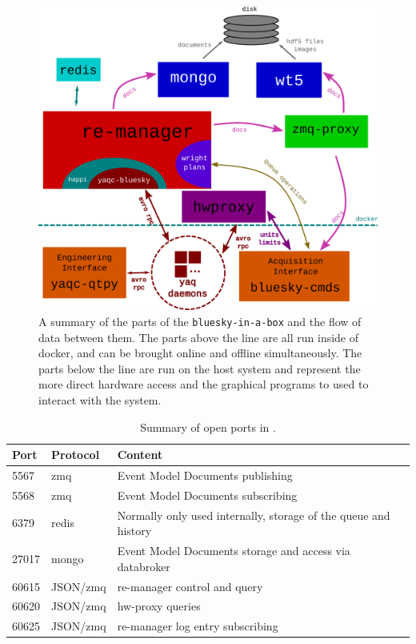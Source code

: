 \begin{figure}
\includegraphics[width=7in]{"acquisition/images/bluesky-in-a-box-architecture"}
\caption[\texttt{bluesky-in-a-box} architecture]{
A summary of the parts of the \texttt{bluesky-in-a-box} and the flow of data between them.
The parts above the line are all run inside of docker, and can be brought online and offline simultaneously.
The parts below the line are run on the host system and represent the more direct hardware access and the graphical programs to used to interact with the system.
}
\label{acq:fig:biab_arch}
\end{figure}

\begin{table}
\centering
\begin{tabular}{lll}
\hline
Port  & Protocol & Content    \\ \hline
5567  & zmq      & Event Model Documents publishing   \\
5568  & zmq      & Event Model Documents subscribing    \\
6379  & redis    & Normally only used internally, storage of the queue and history    \\
27017 & mongo    & Event Model Documents storage and access via databroker \\
60615 & JSON/zmq & re-manager control and query    \\
60620 & JSON/zmq & hw-proxy queries    \\
60625 & JSON/zmq & re-manager log entry subscribing    \\ \hline
\end{tabular}
	\caption[\biab{} Ports]{Summary of open ports in \biab{}.}
\end{table}

